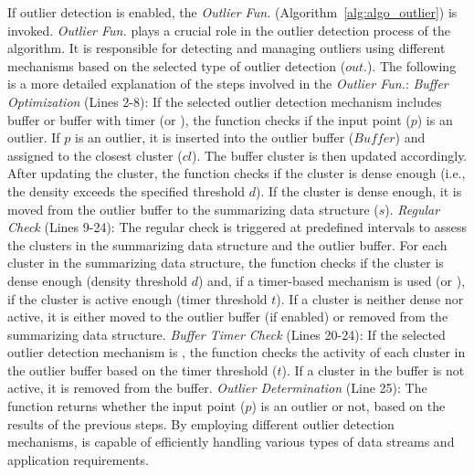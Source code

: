 If outlier detection is enabled, the \emph{Outlier Fun.} (Algorithm~\ref{alg:algo_outlier}) is invoked. \emph{Outlier Fun.}  plays a crucial role in the outlier detection process of the \algo algorithm. It is responsible for detecting and managing outliers using different mechanisms based on the selected type of outlier detection ($out.$). The following is a more detailed explanation of the steps involved in the \emph{Outlier Fun.}:
\emph{Buffer Optimization} (Lines 2-8): If the selected outlier detection mechanism includes buffer or buffer with timer (\buffer or \buffertimer), the function checks if the input point ($p$) is an outlier. If $p$ is an outlier, it is inserted into the outlier buffer ($Buffer$) and assigned to the closest cluster ($cl$). The buffer cluster is then updated accordingly. After updating the cluster, the function checks if the cluster is dense enough (i.e., the density exceeds the specified threshold $d$). If the cluster is dense enough, it is moved from the outlier buffer to the summarizing data structure ($s$).
\emph{Regular Check} (Lines 9-24): The regular check is triggered at predefined intervals to assess the clusters in the summarizing data structure and the outlier buffer. For each cluster in the summarizing data structure, the function checks if the cluster is dense enough (density threshold $d$) and, if a timer-based mechanism is used (\timer or \buffertimer), if the cluster is active enough (timer threshold $t$). If a cluster is neither dense nor active, it is either moved to the outlier buffer (if enabled) or removed from the summarizing data structure.
\emph{Buffer Timer Check} (Lines 20-24): If the selected outlier detection mechanism is \buffertimer, the function checks the activity of each cluster in the outlier buffer based on the timer threshold ($t$). If a cluster in the buffer is not active, it is removed from the buffer.
\emph{Outlier Determination} (Line 25): The function returns whether the input point ($p$) is an outlier or not, based on the results of the previous steps.
By employing different outlier detection mechanisms, \algo is capable of efficiently handling various types of data streams and application requirements.


